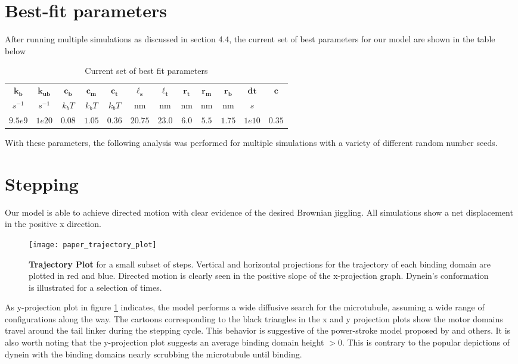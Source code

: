 

\section{Best-fit parameters}
After running multiple simulations as discussed in section 4.4, the current set of best parameters for our model are shown in the table below
\begin{table}[!hbt]
	\centering
	\begin{tabular}{|c|c|c|c|c|c|c|c|c|c|c|c|}
		\hline
		$\mathbf{k_b}$&  $\mathbf{k_{ub}}$ &  $\mathbf{c_b}$&  $\mathbf{c_m}$& $\mathbf{c_t}$ & $\mathbf{\ell_s}$ & $\mathbf{\ell_t}$ & $\mathbf{r_t}$ & $\mathbf{r_m}$ &$\mathbf{r_b}$ & $\mathbf{dt}$ & $\mathbf{c}$\\  
		$s^{-1}$ & $s^{-1}$ & $k_bT$ & $k_bT$ & $k_bT$& nm & nm & nm & nm & nm & $s$ &  \\
		\hline \hline
		$9.5e9$ & $1e20$ & $0.08$ & $1.05$ & $0.36$ & $20.75$ & $23.0$ & $6.0$ & $5.5$ & $1.75$ & $1e10$ & $0.35$\\ 
		\hline
	\end{tabular}
\caption[Best parameters]{Current set of best fit parameters}
\label{table:params}
\end{table}

With these parameters, the following analysis was performed for multiple simulations with a variety of different random number seeds. 



\section{Stepping}

Our model is able to achieve directed motion with clear evidence of the desired Brownian jiggling. All simulations show a net displacement in the positive x direction.
\begin{figure}[!hbt]
	\centering
	\texttt{[image: paper\_trajectory\_plot]}
	\caption[Trajectory plot]{\textbf{Trajectory Plot} for a small subset of steps. Vertical and horizontal projections for the trajectory of each binding domain are plotted in red and blue. Directed motion is clearly seen in the positive slope of the x-projection graph. Dynein's conformation is illustrated for a selection of times.}
	\label{fig:trajectory}
\end{figure}

As y-projection plot in figure \ref{fig:trajectory} indicates, the model performs a wide diffusive search for the microtubule, assuming a wide range of configurations along the way. The cartoons corresponding to the black triangles in the x and y projection plots show the motor domains travel around the tail linker during the stepping cycle. This behavior is suggestive of the power-stroke model proposed by \cite{burgess2003dynein} and others. It is also worth noting that the y-projection plot suggests an average binding domain height $>0$. This is contrary to the popular depictions of dynein with the binding domains nearly scrubbing the microtubule until binding.\\

